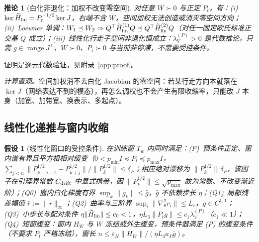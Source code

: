 \documentclass[fontset=windows,11pt]{ctexart}
\newcommand{\W}{W}
\newcommand{\wt}[1]{\widetilde{#1}}
\newtheorem{assumption}{假设}[section]
\newtheorem{corollary}{推论}[section]
\numberwithin{equation}{section}
\begin{document}
\begin{corollary}[白化非退化：加权不改变零空间]\label{cor:ker}
对任意 $\W\succ0$ 与正定 $P_t$，有：(i)~$\ker\wt H_{\rm lin}=P_t^{-1/2}\ker J$，右端不含 $\W$，空间加权无法创造或消灭零空间方向；(ii)~Loewner 单调：$\W_1\preceq\W_2\Rightarrow Q^\top\wt H_{\rm lin}^{(1)}Q\preceq Q^\top\wt H_{\rm lin}^{(2)}Q$（对任一固定欧氏标准正交基 $Q$ 成立）；(iii)~线性化行走子空间非退化恒成立：$\lambda_V^{(P)}>0$ 是代数推论，只需 $g\in\operatorname{range}J^\top$、$\W\succ0$、$P_t\succ0$ 与当前非停滞，\emph{不需要}受控条件。
\end{corollary}
证明是逐元代数验证，见附录~\ref{app:proof}。

\noindent\emph{计算直观。}空间加权消不去白化 Jacobian 的零空间：若某行走方向本就落在 $\ker J$（网络表达不到的模态），再怎么调权也不会产生有限收缩率，只能改 $J$ 本身（加宽、加带宽、换表示、多起点）。

\subsection{线性化递推与窗内收缩}\label{sec:R-linrec}

\begin{assumption}[线性化窗口的受控条件]\label{ass:ctrl}
在训练窗 $T_w$ 内同时满足：(P)~预条件正定、窗内谱有界且平方根\emph{相对}缓变（$0<p_{\min}I\preceq P_t\preceq p_{\max}I$，$\sum_{j<n}\|P_{k+j+1}^{1/2}-P_{k+j}^{1/2}\|/\|P_k^{1/2}\|\le\delta_P$；相应绝对漂移为 $\|P_k^{1/2}\|\,\delta_P$，该因子在引理界常数 $C_{\rm drift}$ 中显式携带，因 $\|P_k^{1/2}\|\le\sqrt{p_{\max}}$ 故为常数、不改变渐近阶）；(Q0)~窗内白化梯度有界 $\sup_k\|\wt g_k\|\le\bar g$，$\bar g$ 不依赖步长 $\eta$；(Q1)~局部残差幅值 $\bar r:=\|r\|_\infty$；(Q2)~曲率与三阶界 $\sup_i\|\nabla_\theta^2r_i\|\le L_r$，$g\in C^{1,1}$；(Q3)~小步长与配对条件 $\eta\|\wt H_{\rm lin}\|\le c_0<1$，$\eta L_3\|P_tg\|\le c_1\lambda_V^{(P)}$（$c_1\ll1$）；(Q4)~短窗缓变：窗内 $H_{\W}$ 与 $\W$ 冻结或外生缓变，预条件器满足 (P) 的缓变条件（不要求 $P_t$ 严格冻结），窗长 $n\le\varepsilon_H\|H_{\W}\|/(\eta L_3a_P\bar g)$。
\end{assumption}
\end{document}
